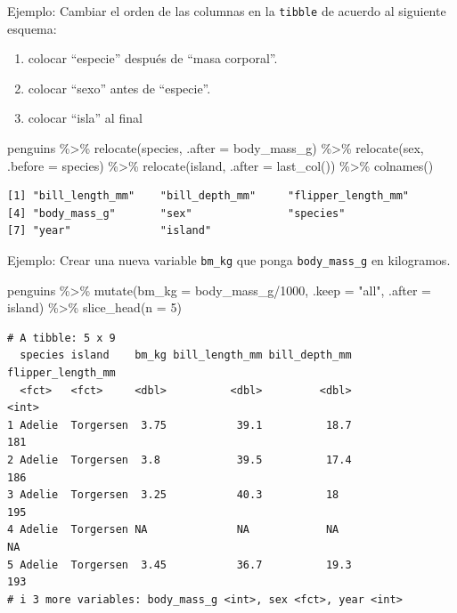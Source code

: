 \documentclass[
  letterpaper,
  DIV=11,
  numbers=noendperiod]{scrreprt}
\newenvironment{Shaded}{\begin{snugshade}}{\end{snugshade}}
\newcommand{\AttributeTok}[1]{\textcolor[rgb]{0.40,0.45,0.13}{#1}}
\newcommand{\DecValTok}[1]{\textcolor[rgb]{0.68,0.00,0.00}{#1}}
\newcommand{\FunctionTok}[1]{\textcolor[rgb]{0.28,0.35,0.67}{#1}}
\newcommand{\NormalTok}[1]{\textcolor[rgb]{0.00,0.23,0.31}{#1}}
\newcommand{\SpecialCharTok}[1]{\textcolor[rgb]{0.37,0.37,0.37}{#1}}
\newcommand{\StringTok}[1]{\textcolor[rgb]{0.13,0.47,0.30}{#1}}
\providecommand{\tightlist}{%
  \setlength{\itemsep}{0pt}\setlength{\parskip}{0pt}}\usepackage{longtable,booktabs,array}
\begin{document}
{Ejemplo}: Cambiar el orden de las columnas en la \texttt{tibble} de
acuerdo al siguiente esquema:

\begin{enumerate}
\def\labelenumi{\arabic{enumi}.}
\tightlist
\item
  colocar ``especie'' después de ``masa corporal''.
\item
  colocar ``sexo'' antes de ``especie''.
\item
  colocar ``isla'' al final
\end{enumerate}

\begin{Shaded}
\begin{Highlighting}[]
\NormalTok{penguins }\SpecialCharTok{\%\textgreater{}\%} 
  \FunctionTok{relocate}\NormalTok{(species, }\AttributeTok{.after =}\NormalTok{ body\_mass\_g) }\SpecialCharTok{\%\textgreater{}\%}
  \FunctionTok{relocate}\NormalTok{(sex, }\AttributeTok{.before =}\NormalTok{ species) }\SpecialCharTok{\%\textgreater{}\%}
  \FunctionTok{relocate}\NormalTok{(island, }\AttributeTok{.after =} \FunctionTok{last\_col}\NormalTok{()) }\SpecialCharTok{\%\textgreater{}\%}
  \FunctionTok{colnames}\NormalTok{()}
\end{Highlighting}
\end{Shaded}

\begin{verbatim}
[1] "bill_length_mm"    "bill_depth_mm"     "flipper_length_mm"
[4] "body_mass_g"       "sex"               "species"          
[7] "year"              "island"           
\end{verbatim}

{Ejemplo}: Crear una nueva variable \texttt{bm\_kg} que ponga
\texttt{body\_mass\_g} en kilogramos.

\begin{Shaded}
\begin{Highlighting}[]
\NormalTok{penguins }\SpecialCharTok{\%\textgreater{}\%} 
  \FunctionTok{mutate}\NormalTok{(}\AttributeTok{bm\_kg =}\NormalTok{ body\_mass\_g}\SpecialCharTok{/}\DecValTok{1000}\NormalTok{, }\AttributeTok{.keep =} \StringTok{"all"}\NormalTok{, }\AttributeTok{.after =}\NormalTok{ island) }\SpecialCharTok{\%\textgreater{}\%} 
  \FunctionTok{slice\_head}\NormalTok{(}\AttributeTok{n =} \DecValTok{5}\NormalTok{)}
\end{Highlighting}
\end{Shaded}

\begin{verbatim}
# A tibble: 5 x 9
  species island    bm_kg bill_length_mm bill_depth_mm flipper_length_mm
  <fct>   <fct>     <dbl>          <dbl>         <dbl>             <int>
1 Adelie  Torgersen  3.75           39.1          18.7               181
2 Adelie  Torgersen  3.8            39.5          17.4               186
3 Adelie  Torgersen  3.25           40.3          18                 195
4 Adelie  Torgersen NA              NA            NA                  NA
5 Adelie  Torgersen  3.45           36.7          19.3               193
# i 3 more variables: body_mass_g <int>, sex <fct>, year <int>
\end{verbatim}
\end{document}
